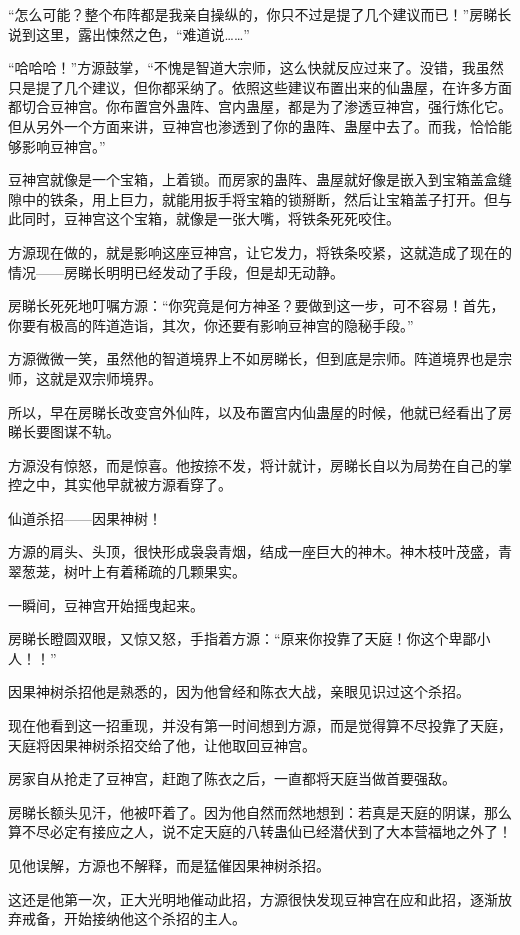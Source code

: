 \begin{this_body}
“怎么可能？整个布阵都是我亲自操纵的，你只不过是提了几个建议而已！”房睇长说到这里，露出悚然之色，“难道说……”

“哈哈哈！”方源鼓掌，“不愧是智道大宗师，这么快就反应过来了。没错，我虽然只是提了几个建议，但你都采纳了。依照这些建议布置出来的仙蛊屋，在许多方面都切合豆神宫。你布置宫外蛊阵、宫内蛊屋，都是为了渗透豆神宫，强行炼化它。但从另外一个方面来讲，豆神宫也渗透到了你的蛊阵、蛊屋中去了。而我，恰恰能够影响豆神宫。”

豆神宫就像是一个宝箱，上着锁。而房家的蛊阵、蛊屋就好像是嵌入到宝箱盖盒缝隙中的铁条，用上巨力，就能用扳手将宝箱的锁掰断，然后让宝箱盖子打开。但与此同时，豆神宫这个宝箱，就像是一张大嘴，将铁条死死咬住。

方源现在做的，就是影响这座豆神宫，让它发力，将铁条咬紧，这就造成了现在的情况——房睇长明明已经发动了手段，但是却无动静。

房睇长死死地叮嘱方源：“你究竟是何方神圣？要做到这一步，可不容易！首先，你要有极高的阵道造诣，其次，你还要有影响豆神宫的隐秘手段。”

方源微微一笑，虽然他的智道境界上不如房睇长，但到底是宗师。阵道境界也是宗师，这就是双宗师境界。

所以，早在房睇长改变宫外仙阵，以及布置宫内仙蛊屋的时候，他就已经看出了房睇长要图谋不轨。

方源没有惊怒，而是惊喜。他按捺不发，将计就计，房睇长自以为局势在自己的掌控之中，其实他早就被方源看穿了。

仙道杀招——因果神树！

方源的肩头、头顶，很快形成袅袅青烟，结成一座巨大的神木。神木枝叶茂盛，青翠葱茏，树叶上有着稀疏的几颗果实。

一瞬间，豆神宫开始摇曳起来。

房睇长瞪圆双眼，又惊又怒，手指着方源：“原来你投靠了天庭！你这个卑鄙小人！！”

因果神树杀招他是熟悉的，因为他曾经和陈衣大战，亲眼见识过这个杀招。

现在他看到这一招重现，并没有第一时间想到方源，而是觉得算不尽投靠了天庭，天庭将因果神树杀招交给了他，让他取回豆神宫。

房家自从抢走了豆神宫，赶跑了陈衣之后，一直都将天庭当做首要强敌。

房睇长额头见汗，他被吓着了。因为他自然而然地想到：若真是天庭的阴谋，那么算不尽必定有接应之人，说不定天庭的八转蛊仙已经潜伏到了大本营福地之外了！

见他误解，方源也不解释，而是猛催因果神树杀招。

这还是他第一次，正大光明地催动此招，方源很快发现豆神宫在应和此招，逐渐放弃戒备，开始接纳他这个杀招的主人。


\end{this_body}
